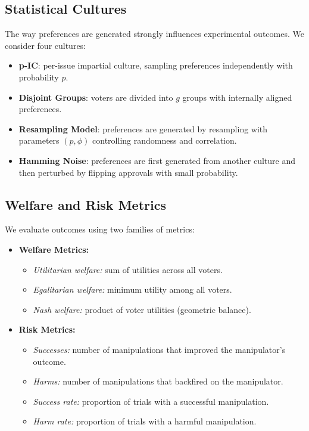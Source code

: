 \documentclass[11pt]{article}
\begin{document}
\subsection{Statistical Cultures}
The way preferences are generated strongly influences experimental outcomes.
We consider four cultures:
\begin{itemize}
    \item \textbf{p-IC}: per-issue impartial culture, sampling preferences
    independently with probability $p$.
    \item \textbf{Disjoint Groups}: voters are divided into $g$ groups with
    internally aligned preferences.
    \item \textbf{Resampling Model}: preferences are generated by resampling
    with parameters $(p, \phi)$ controlling randomness and correlation.
    \item \textbf{Hamming Noise}: preferences are first generated from another
    culture and then perturbed by flipping approvals with small probability.
\end{itemize}

\subsection{Welfare and Risk Metrics}
We evaluate outcomes using two families of metrics:
\begin{itemize}
    \item \textbf{Welfare Metrics:}  
    \begin{itemize}
        \item \emph{Utilitarian welfare:} sum of utilities across all voters.  
        \item \emph{Egalitarian welfare:} minimum utility among all voters.  
        \item \emph{Nash welfare:} product of voter utilities (geometric balance).  
    \end{itemize}
    \item \textbf{Risk Metrics:}  
    \begin{itemize}
        \item \emph{Successes:} number of manipulations that improved the manipulator’s outcome.  
        \item \emph{Harms:} number of manipulations that backfired on the manipulator.  
        \item \emph{Success rate:} proportion of trials with a successful manipulation.  
        \item \emph{Harm rate:} proportion of trials with a harmful manipulation.  
    \end{itemize}
\end{itemize}
\end{document}
